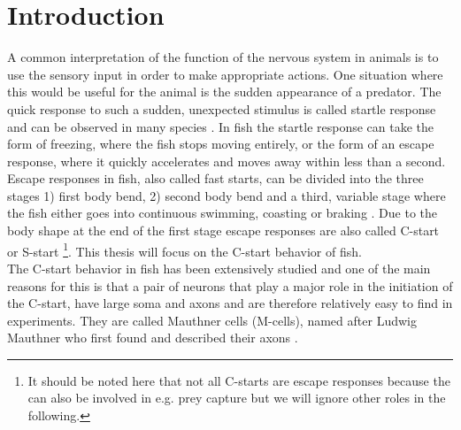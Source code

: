 \documentclass[a4paper,10pt,hidelinks]{scrreprt}
\begin{document}
	\chapter{Introduction}
	A common interpretation of the function of the nervous system in animals is 
	to use the sensory input in order to make appropriate actions.
	One situation where this would be useful for the animal is the sudden 
	appearance of a predator.
	The quick response to such a sudden, unexpected stimulus is called startle 
	response and can be observed in many species \citep{Eaton1984a}.
	In fish the startle response can take the form of freezing, where the fish 
	stops moving entirely, or the form of an escape response, where it quickly 
	accelerates and moves away within less than a second.
	Escape responses in fish, also called fast starts, can be divided into the 
	three stages 1) first body bend, 2) second body bend and a third, variable 
	stage where the fish either goes into continuous swimming, coasting or 
	braking \citep{Domenici2011}.
	Due to the body shape at the end of the first stage escape responses are 
	also called C-start or S-start \citep{Domenici2011}\footnote{It should be 
	noted here that not all C-starts are escape responses because the can also 
	be involved in e.g. prey capture but we will ignore other roles in the 
	following.}.
	This thesis will focus on the C-start behavior of fish.\\
	The C-start behavior in fish has been extensively studied and one of the 
	main reasons for this is that a pair of neurons that play a major role in 
	the initiation of the C-start, have large soma and axons and are therefore 
	relatively easy to find in experiments.
	They are called Mauthner cells (M-cells), named after Ludwig Mauthner who 
	first found and described their axons \citep{Mauthner1859}.
	
\end{document}
